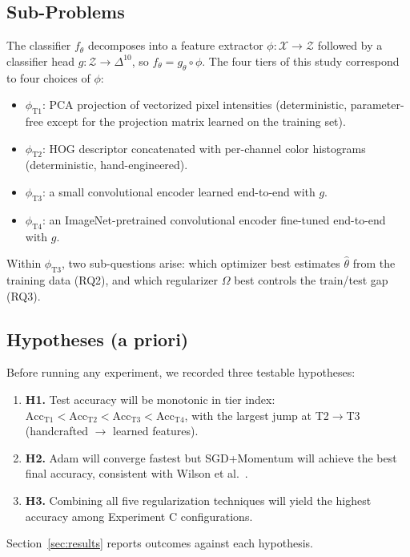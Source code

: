 \documentclass[10pt,letterpaper]{article}
\begin{document}
\subsection{Sub-Problems}
The classifier $f_\theta$ decomposes into a feature extractor $\phi : \mathcal{X} \rightarrow \mathcal{Z}$ followed by a classifier head $g : \mathcal{Z} \rightarrow \Delta^{10}$, so $f_\theta = g_\theta \circ \phi$. The four tiers of this study correspond to four choices of $\phi$:
\begin{itemize}[leftmargin=2em]
    \item $\phi_\text{T1}$: PCA projection of vectorized pixel intensities (deterministic, parameter-free except for the projection matrix learned on the training set).
    \item $\phi_\text{T2}$: HOG descriptor concatenated with per-channel color histograms (deterministic, hand-engineered).
    \item $\phi_\text{T3}$: a small convolutional encoder learned end-to-end with $g$.
    \item $\phi_\text{T4}$: an ImageNet-pretrained convolutional encoder fine-tuned end-to-end with $g$.
\end{itemize}
Within $\phi_\text{T3}$, two sub-questions arise: which optimizer best estimates $\hat\theta$ from the training data (RQ2), and which regularizer $\Omega$ best controls the train/test gap (RQ3).

\subsection{Hypotheses (a priori)}
Before running any experiment, we recorded three testable hypotheses:
\begin{enumerate}[leftmargin=2em]
    \item \textbf{H1.} Test accuracy will be monotonic in tier index: $\text{Acc}_\text{T1} < \text{Acc}_\text{T2} < \text{Acc}_\text{T3} < \text{Acc}_\text{T4}$, with the largest jump at T2$\rightarrow$T3 (handcrafted $\rightarrow$ learned features).
    \item \textbf{H2.} Adam will converge fastest but SGD+Momentum will achieve the best final accuracy, consistent with Wilson et al.~\cite{wilson2017}.
    \item \textbf{H3.} Combining all five regularization techniques will yield the highest accuracy among Experiment C configurations.
\end{enumerate}
Section~\ref{sec:results} reports outcomes against each hypothesis.
\end{document}
